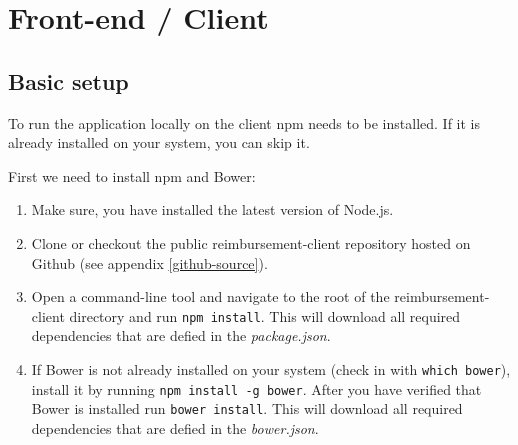 \section{Front-end / Client}

\subsection{Basic setup}
To run the application locally on the client npm needs to be installed. If it is already installed on your system, you can skip it.

First we need to install npm and Bower:
\begin{enumerate}
  \item Make sure, you have installed the latest version of Node.js.
  \item Clone or checkout the public reimbursement-client repository hosted on Github (see appendix \ref{github-source}).
  \item Open a command-line tool and navigate to the root of the reimbursement-client directory and run \texttt{npm install}. This will download all required dependencies that are defied in the \textit{package.json}.
  \item If Bower is not already installed on your system (check in with \texttt{which bower}), install it by running \texttt{npm install -g bower}. After you have verified that Bower is installed run \texttt{bower install}. This will download all required dependencies that are defied in the \textit{bower.json}.
\end{enumerate}

